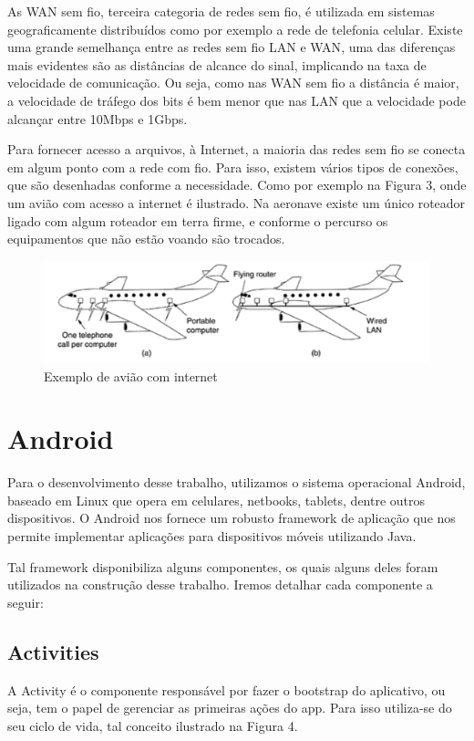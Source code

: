 \documentclass[12pt, %
openright, 
oneside,
a4paper,
brazil]{facom-ufu-abntex2}
\begin{document}
As \ac{WAN} sem fio, terceira categoria de redes sem fio, é utilizada em sistemas geograficamente distribuídos como por exemplo a rede de telefonia celular. Existe uma grande semelhança entre as redes sem fio \ac{LAN} e \ac{WAN}, uma das diferenças mais evidentes são as distâncias de alcance do sinal, implicando na taxa de velocidade de comunicação. Ou seja, como nas \ac{WAN} sem fio a distância é maior, a velocidade de tráfego dos bits é bem menor que nas \ac{LAN} que a velocidade pode alcançar entre 10Mbps e 1Gbps.

Para fornecer acesso a arquivos, à Internet, a maioria das redes sem fio se conecta   em algum ponto com a rede com fio. Para isso, existem vários tipos de conexões, que são desenhadas conforme a necessidade. Como por exemplo na Figura 3, onde um avião com acesso a internet é ilustrado. Na aeronave existe um único roteador ligado com algum roteador em terra firme, e conforme o percurso os equipamentos  que não estão voando são trocados.

\begin{figure}[hbt]
  \includegraphics[scale=0.9]{aviao}
  \caption{Exemplo de avião com internet \cite{tanenbaum2003redes}}
\end{figure}



\section{Android}

	Para o desenvolvimento desse trabalho, utilizamos o sistema operacional Android, baseado em Linux que opera em celulares, netbooks, tablets, dentre outros dispositivos. O Android nos fornece um robusto framework de aplicação que nos permite implementar aplicações para dispositivos móveis utilizando Java.
	
	Tal framework disponibiliza alguns componentes, os quais alguns deles foram utilizados na construção desse trabalho.
	Iremos detalhar cada componente a seguir:
	\cite{googleand}
	
	\subsection{Activities}
	A Activity é o componente responsável por fazer o bootstrap do aplicativo, ou seja, tem o papel de gerenciar as primeiras ações do app. Para isso utiliza-se do seu ciclo de vida, tal conceito ilustrado na Figura 4.
	
\end{document}
